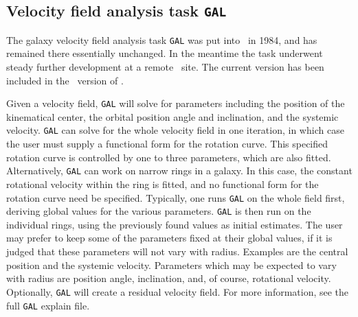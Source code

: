 \subsection{Velocity field analysis task {\tt GAL}}

The galaxy velocity field analysis task {\tt GAL} was put into \AIPS\
in 1984, and has remained there essentially unchanged.  In the
meantime the task underwent steady further development at a remote
\AIPS\ site.  The current version has been included in the
\RELEASENAME\ version of \hbox{{\AIPS}}.

Given a velocity field, {\tt GAL} will solve for parameters including
the position of the kinematical center, the orbital position angle and
inclination, and the systemic velocity.  {\tt GAL} can solve for the
whole velocity field in one iteration, in which case the user must
supply a functional form for the rotation curve.  This specified
rotation curve is controlled  by one to three parameters, which are
also fitted.  Alternatively, {\tt GAL} can work on narrow rings in a
galaxy.  In this case, the constant rotational velocity within the
ring is fitted, and no functional form for the rotation curve need be
specified.  Typically, one runs {\tt GAL} on the whole field first,
deriving global values for the various parameters.  {\tt GAL} is then
run on the individual rings, using the previously found values as
initial estimates.  The user may prefer to keep some of the parameters
fixed at their global values, if it is judged that these parameters
will not vary with radius.  Examples are the central position and the
systemic velocity.  Parameters which may be expected to vary with
radius are position angle, inclination, and, of course, rotational
velocity.  Optionally, {\tt GAL} will create a residual velocity
field.  For more information, see the full {\tt GAL} explain file.

